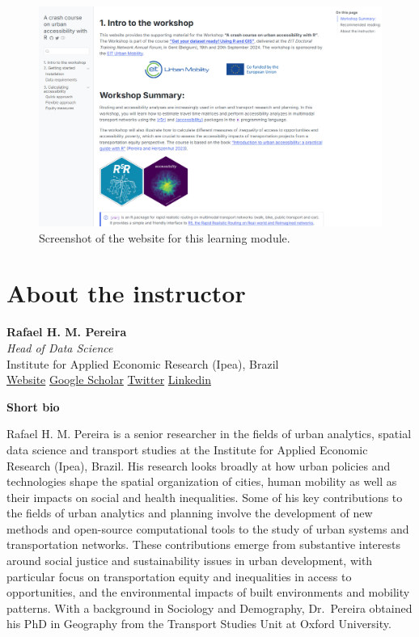 \documentclass[
  letterpaper,
  DIV=11,
  numbers=noendperiod]{scrreprt}
\begin{document}
\begin{figure}[H]

{\centering \includegraphics{images/clipboard-4241488434.png}

}

\caption{Screenshot of the website for this learning module.}

\end{figure}%

\section*{About the instructor}\label{about-the-instructor}


\textbf{Rafael H. M. Pereira}\\
\emph{Head of Data Science}\\
Institute for Applied Economic Research (Ipea), Brazil\\
\href{https://www.urbandemographics.org/about/}{Website} \textbar{}
\href{https://scholar.google.com.br/citations?user=dbRivsEAAAAJ&hl}{Google
Scholar} \textbar{} \href{https://x.com/UrbanDemog}{Twitter} \textbar{}
\href{https://www.linkedin.com/in/rafael-h-m-pereira/}{Linkedin}
\textbar{}

\textbf{Short bio}

Rafael H. M. Pereira is a senior researcher in the fields of urban
analytics, spatial data science and transport studies at the Institute
for Applied Economic Research (Ipea), Brazil. His research looks broadly
at how urban policies and technologies shape the spatial organization of
cities, human mobility as well as their impacts on social and health
inequalities. Some of his key contributions to the fields of urban
analytics and planning involve the development of new methods and
open-source computational tools to the study of urban systems and
transportation networks. These contributions emerge from substantive
interests around social justice and sustainability issues in urban
development, with particular focus on transportation equity and
inequalities in access to opportunities, and the environmental impacts
of built environments and mobility patterns. With a background in
Sociology and Demography, Dr.~Pereira obtained his PhD in Geography from
the Transport Studies Unit at Oxford University.
\end{document}
